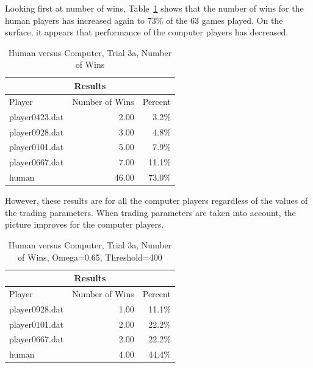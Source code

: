 Looking first at number of wins, Table~\ref{tab:human_results3a} shows that the
number of wins for the human players has increased again to 73\% of the 63 games
played. On the surface, it appears that performance of the computer players has
decreased.

\begin{table}[htbp]
  \centering
  \caption{Human versus Computer, Trial 3a, Number of Wins}
    \begin{tabular}{lrr}
    \toprule
    \multicolumn{3}{c}{Results}  \\
    \midrule
    Player & Number of Wins & Percent \\
 \midrule
    \multicolumn{1}{l}{player0423.dat} & 2.00   & 3.2\% \\
    \multicolumn{1}{l}{player0928.dat} & 3.00   & 4.8\% \\
    \multicolumn{1}{l}{player0101.dat} & 5.00   & 7.9\% \\
    \multicolumn{1}{l}{player0667.dat} & 7.00   & 11.1\% \\
    \multicolumn{1}{l}{human} & 46.00  & 73.0\% \\
    \bottomrule
    \end{tabular}%
  \label{tab:human_results3a}%
\end{table}%

However, these results are for all the computer players regardless of the values
of the trading parameters. When trading parameters are taken into account, the
picture improves for the computer players.

\begin{table}[htbp]
  \centering
  \caption{Human versus Computer, Trial 3a, Number of Wins, Omega=0.65, Threshold=400}
    \begin{tabular}{lrr}
    \toprule
    \multicolumn{3}{c}{Results}  \\
    \midrule
    Player & Number of Wins & Percent \\
 \midrule
    \multicolumn{1}{l}{player0928.dat} & 1.00   & 11.1\% \\
    \multicolumn{1}{l}{player0101.dat} & 2.00   & 22.2\% \\
    \multicolumn{1}{l}{player0667.dat} & 2.00   & 22.2\% \\
    \multicolumn{1}{l}{human} & 4.00   & 44.4\% \\
    \bottomrule
    \end{tabular}%
  \label{tab:human_results3b}%
\end{table}%

